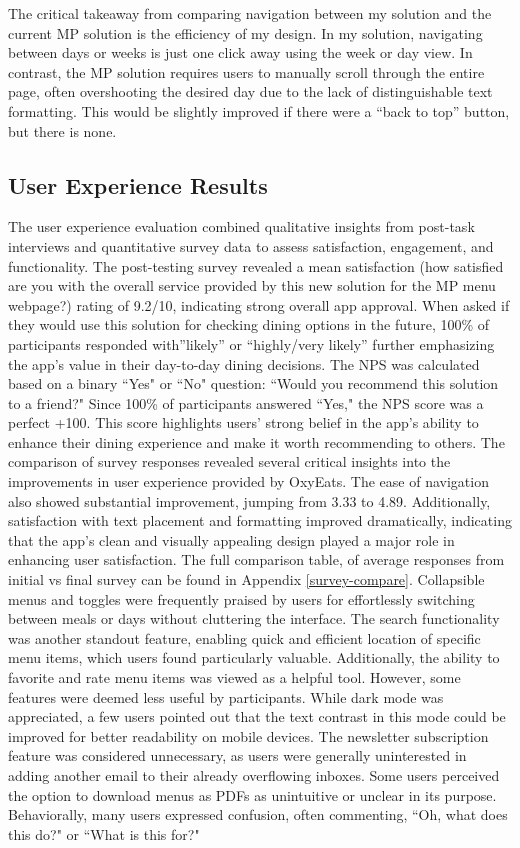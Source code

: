\documentclass[10pt,twocolumn]{article}
\begin{document}
The critical takeaway from comparing navigation between my solution and the current MP solution is the efficiency of my design. In my solution, navigating between days or weeks is just one click away using the week or day view. In contrast, the MP solution requires users to manually scroll through the entire page, often overshooting the desired day due to the lack of distinguishable text formatting. This would be slightly improved  if there were a “back to top” button, but there is none.

\subsection{User Experience Results}
The user experience evaluation combined qualitative insights from post-task interviews and quantitative survey data to assess satisfaction, engagement, and functionality. The post-testing survey revealed a mean satisfaction (how satisfied are you with the overall service provided by this new solution for the MP menu webpage?) rating of 9.2/10, indicating strong overall app approval. When asked if they would use this solution for checking dining options in the future, 100\% of participants responded with”likely” or “highly/very likely” further emphasizing the app's value in their day-to-day dining decisions. The NPS was calculated based on a binary ``Yes" or ``No" question: ``Would you recommend this solution to a friend?" Since 100\% of participants answered ``Yes," the NPS score was a perfect +100. This score highlights users' strong belief in the app's ability to enhance their dining experience and make it worth recommending to others. The comparison of survey responses revealed several critical insights into the improvements in user experience provided by OxyEats. The ease of navigation also showed substantial improvement, jumping from 3.33 to 4.89. Additionally, satisfaction with text placement and formatting improved dramatically, indicating that the app’s clean and visually appealing design played a major role in enhancing user satisfaction. The full comparison table, of average responses from initial vs final survey can be found in Appendix \ref{survey-compare}. Collapsible menus and toggles were frequently praised by users for effortlessly switching between meals or days without cluttering the interface. The search functionality was another standout feature, enabling quick and efficient location of specific menu items, which users found particularly valuable.  Additionally, the ability to favorite and rate menu items was viewed as a helpful tool. However, some features were deemed less useful by participants. While dark mode was appreciated, a few users pointed out that the text contrast in this mode could be improved for better readability on mobile devices. The newsletter subscription feature was considered unnecessary, as users were generally uninterested in adding another email to their already overflowing inboxes. Some users perceived the option to download menus as PDFs as unintuitive or unclear in its purpose. Behaviorally, many users expressed confusion, often commenting, ``Oh, what does this do?" or ``What is this for?"
\end{document}
